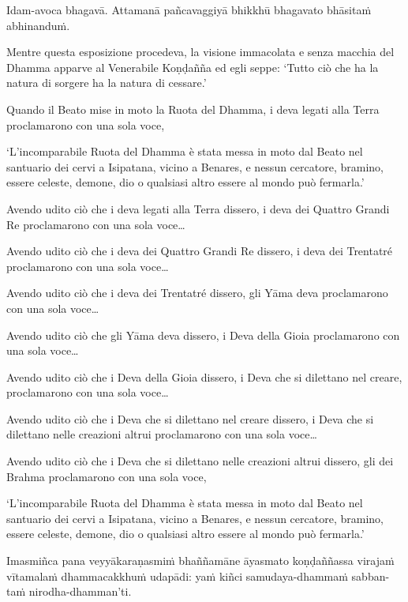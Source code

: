 Idam-avoca bhagavā. Attamanā pañcavaggiyā bhikkhū bhagavato bhāsitaṁ
abhinanduṁ.

\clearpage

\englishText
\markboth{\englishTitle}{\rightmark}

Mentre questa esposizione procedeva, la visione immacolata e senza macchia del
Dhamma apparve al Venerabile Koṇḍañña ed egli seppe: ‘Tutto ciò
che ha la natura di sorgere ha la natura di cessare.’

Quando il Beato mise in moto la Ruota del Dhamma, i
deva legati alla Terra proclamarono con una sola voce,

‘L'incomparabile Ruota del Dhamma è stata messa in moto dal Beato
nel santuario dei cervi a Isipatana, vicino a Benares, e nessun cercatore,
bramino, essere celeste, demone, dio o qualsiasi altro essere al mondo
può fermarla.’

Avendo udito ciò che i deva legati alla Terra dissero, i deva dei Quattro Grandi
Re proclamarono con una sola voce\ldots

Avendo udito ciò che i deva dei Quattro Grandi Re dissero, i deva dei
Trentatré proclamarono con una sola voce\ldots

Avendo udito ciò che i deva dei Trentatré dissero, gli Yāma deva
proclamarono con una sola voce\ldots

Avendo udito ciò che gli Yāma deva dissero, i Deva della Gioia proclamarono
con una sola voce\ldots

Avendo udito ciò che i Deva della Gioia dissero, i Deva che si dilettano
nel creare, proclamarono con una sola voce\ldots

Avendo udito ciò che i Deva che si dilettano nel creare dissero, i Deva che
si dilettano nelle creazioni altrui proclamarono con una sola voce\ldots

Avendo udito ciò che i Deva che si dilettano nelle creazioni altrui dissero,
gli dei Brahma proclamarono con una sola voce,

‘L'incomparabile Ruota del Dhamma è stata messa in moto dal Beato
nel santuario dei cervi a Isipatana, vicino a Benares, e nessun cercatore,
bramino, essere celeste, demone, dio o qualsiasi altro essere al mondo
può fermarla.’

\clearpage

\paliText
\markboth{\paliTitle}{\rightmark}

Imasmiñca pana veyyākaraṇasmiṁ bhaññamāne āyasmato koṇḍaññassa virajaṁ
vītamalaṁ dhammacakkhuṁ udapādi: yaṁ kiñci samudaya-dhammaṁ sabban-taṁ
nirodha-dhamman'ti.


